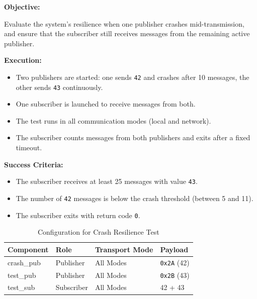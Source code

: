 \textbf{Objective:} 

\vspace{0.4em}
Evaluate the system's resilience when one publisher crashes mid-transmission, and ensure that the subscriber still receives messages from the remaining active publisher.

\vspace{0.5em}
\textbf{Execution:}
\begin{itemize}
	\item Two publishers are started: one sends \texttt{42} and crashes after 10 messages, the other sends \texttt{43} continuously.
	\item One subscriber is launched to receive messages from both.
	\item The test runs in all communication modes (local and network).
	\item The subscriber counts messages from both publishers and exits after a fixed timeout.
\end{itemize}

\textbf{Success Criteria:}
\begin{itemize}
	\item The subscriber receives at least 25 messages with value \texttt{43}.
	\item The number of \texttt{42} messages is below the crash threshold (between 5 and 11).
	\item The subscriber exits with return code \texttt{0}.
\end{itemize}

\begin{table}[H]
	\centering
	\begin{tabular}{@{}llll@{}}
		\toprule
		\textbf{Component} & \textbf{Role}     & \textbf{Transport Mode} & \textbf{Payload} \\
		\midrule
		crash\_pub         & Publisher         & All Modes               & \texttt{0x2A} (42) \\
		test\_pub          & Publisher         & All Modes               & \texttt{0x2B} (43) \\
		test\_sub          & Subscriber        & All Modes               & 42 + 43 \\
		\bottomrule
	\end{tabular}
	\caption{Configuration for Crash Resilience Test}
	\label{tab:crash_resilience}
\end{table}

\vspace{0.5em}

